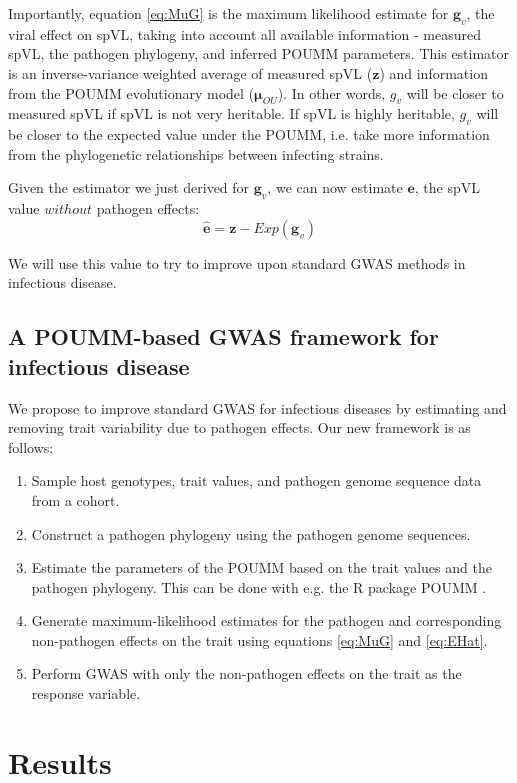 \documentclass[]{article}
\begin{document}
\begin{doublespace}
Importantly, equation \ref{eq:MuG} is the maximum likelihood estimate for $\bm{g}_v$, the viral effect on spVL, taking into account all available information - measured spVL, the pathogen phylogeny, and inferred POUMM parameters. This estimator is an inverse-variance weighted average of measured spVL ($\bm{z}$) and information from the POUMM evolutionary model ($\bm{\mu}_{OU}$). In other words, $g_v$ will be closer to measured spVL if spVL is not very heritable. If spVL is highly heritable, $g_v$ will be closer to the expected value under the POUMM, i.e. take more information from the phylogenetic relationships between infecting strains. 

Given the estimator we just derived for $\bm{g}_v$, we can now estimate $\bm{e}$, the spVL value $without$ pathogen effects: 
\begin{equation}
	\hat{\bm{e}} = \bm{z} - Exp(\bm{g}_v)
	\label{eq:EHat}
\end{equation}

We will use this value to try to improve upon standard GWAS methods in infectious disease.

\subsection{A POUMM-based GWAS framework for infectious disease}

We propose to improve standard GWAS for infectious diseases by estimating and removing trait variability due to pathogen effects. Our new framework is as follows:

\begin{enumerate}
	\item Sample host genotypes, trait values, and pathogen genome sequence data from a cohort.
	\item Construct a pathogen phylogeny using the pathogen genome sequences.
	\item Estimate the parameters of the POUMM based on the trait values and the pathogen phylogeny. This can be done with e.g. the R package POUMM \citep{Mitov2017a-POUMM}.
	\item Generate maximum-likelihood estimates for the pathogen and corresponding non-pathogen effects on the trait using equations \ref{eq:MuG} and \ref{eq:EHat}.
	\item Perform GWAS with only the non-pathogen effects on the trait as the response variable.
\end{enumerate}

\section{Results}


\end{doublespace}
\end{document}
